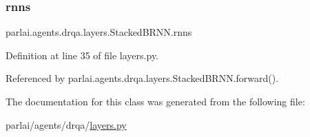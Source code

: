 \subsubsection{\texorpdfstring{rnns}{rnns}}
{\footnotesize\ttfamily parlai.\+agents.\+drqa.\+layers.\+Stacked\+B\+R\+N\+N.\+rnns}



Definition at line 35 of file layers.\+py.



Referenced by parlai.\+agents.\+drqa.\+layers.\+Stacked\+B\+R\+N\+N.\+forward().



The documentation for this class was generated from the following file\+:\begin{DoxyCompactItemize}
\item 
parlai/agents/drqa/\hyperlink{layers_8py}{layers.\+py}\end{DoxyCompactItemize}
